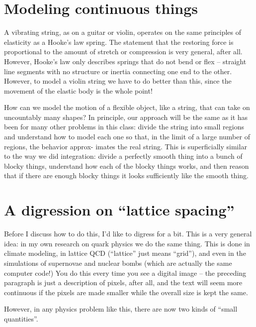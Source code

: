 \documentclass[12ampt]{article}
\begin{document}
\Large
\centerline{} 
\normalsize

\section{Modeling continuous things}

 A vibrating string, as on a guitar or violin, operates on the same principles of elasticity as
 a Hooke’s law spring. The statement that the restoring force is proportional to the amount
 of stretch or compression is very general, after all. 
 However, Hooke's law only describes springs that do not bend or flex -- straight line segments with no structure or inertia connecting one end to the other. However,
 to model a violin string we have to do better than this, since the movement of the elastic
 body is the whole point!

 How can we model the motion of a flexible object, like a string, that can take on 
 uncountably many shapes? In principle, our approach will be the same as it has been for
 many other problems in this class: divide the string into small regions and understand how
 to model each one so that, in the limit of a large number of regions, the behavior approx-
 imates the real string. This is superficially similar to the way we did integration: divide a
 perfectly smooth thing into a bunch of blocky things, understand how each of the blocky
 things works, and then reason that if there are enough blocky things it looks sufficiently like
 the smooth thing.

\section{A digression on ``lattice spacing''}

Before I discuss how to do this, I’d like to digress for a bit. This is a very general idea: in
my own research on quark physics we do the same thing. This is done in climate modeling,
in lattice QCD (``lattice'' just means ``grid''), and even in the simulations of supernovae and nuclear bombs (which are
actually the same computer code!) You do this every time you see a digital image – the
preceding paragraph is just a description of pixels, after all, and the text will seem more continuous
if the pixels are made smaller while the overall size is kept the same.

However, in any physics problem like this, there are now two kinds of ``small quantities''. 
\end{document}
